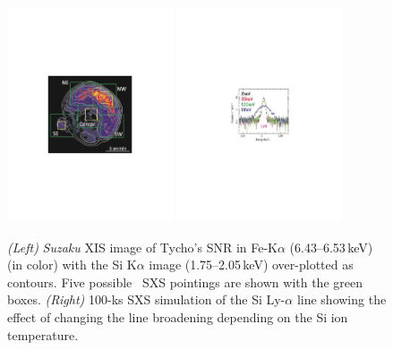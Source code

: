 \documentclass[11pt,a4paper]{article}
\begin{document}
\begin{figure}
  \begin{center}
     \includegraphics[height=2.5in,clip,trim=148 250 149 250]{tychoSXSpointings}
     \includegraphics[height=2.5in,clip,trim=190 290 190 290]{tycho100ks-SiLa-width}
  \caption{{\it (Left)} {\it Suzaku} XIS image of Tycho's SNR in
    Fe-K$\alpha$ (6.43--6.53\,keV) (in color) with the Si K$\alpha$
    image (1.75--2.05\,keV) over-plotted as contours.  Five possible
    \ah\ SXS pointings are shown with the green boxes. {\it (Right)}
    100-ks SXS simulation of the Si Ly-$\alpha$ line showing the effect of 
   changing the line broadening depending on the Si ion temperature.}
  \label{tycho:ptgs}
  \end{center}
\end{figure}
\end{document}
